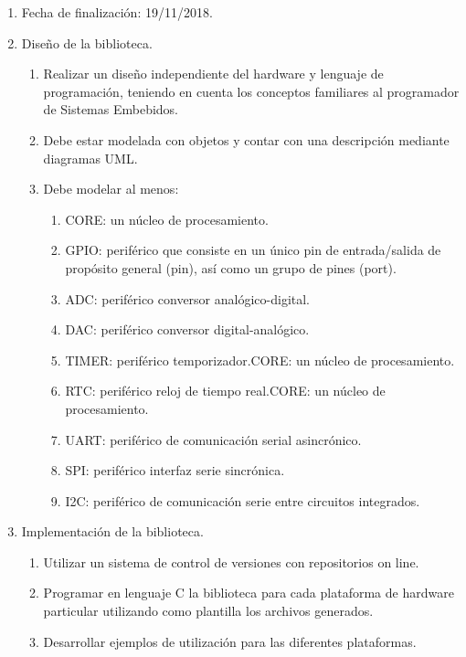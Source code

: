 \begin{enumerate}
   \item Fecha de finalización: 19/11/2018.
   \item Diseño de la biblioteca.
      \begin{enumerate}[1]
         \item Realizar un diseño independiente del hardware y lenguaje de programación, teniendo en cuenta los conceptos familiares al programador de Sistemas Embebidos.
         \item Debe estar modelada con objetos y contar con una descripción mediante diagramas UML.
         \item Debe modelar al menos:
            \begin{enumerate}[1]
               \item CORE: un núcleo de procesamiento.
               \item GPIO: periférico que consiste en un único pin de entrada/salida de propósito general (pin), así como un grupo de pines (port).
               \item ADC: periférico conversor analógico-digital.
               \item DAC: periférico conversor digital-analógico.
               \item TIMER: periférico temporizador.CORE: un núcleo de procesamiento.
               \item RTC: periférico reloj de tiempo real.CORE: un núcleo de procesamiento.
               \item UART: periférico de comunicación serial asincrónico.
               \item SPI: periférico interfaz serie sincrónica.
               \item I2C: periférico de comunicación serie entre circuitos integrados.
            \end{enumerate}
      \end{enumerate}
   \item Implementación de la biblioteca.
      \begin{enumerate}[1]
         \item Utilizar un sistema de control de versiones con repositorios on line.
         \item Programar en lenguaje C la biblioteca para cada plataforma de hardware particular utilizando como plantilla los archivos generados.
         \item Desarrollar ejemplos de utilización para las diferentes plataformas.
      \end{enumerate}

\end{enumerate}
